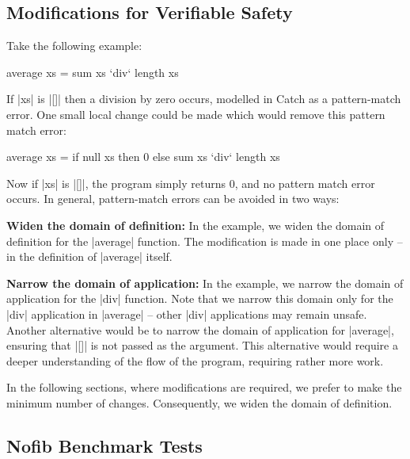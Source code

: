 \documentclass[preprint]{sigplanconf}
\newcommand{\para}[1]{\vspace{2mm}\noindent\textbf{#1}}
\begin{document}
\subsection{Modifications for Verifiable Safety}
\label{sec:safety}

Take the following example:

\begin{code}
average xs = sum xs `div` length xs
\end{code}

If |xs| is |[]| then a division by zero occurs, modelled in Catch as a pattern-match error. One small local change could be made which would remove this pattern match error:

\begin{code}
average xs = if null xs then 0 else sum xs `div` length xs
\end{code}

\noindent Now if |xs| is |[]|, the program simply returns 0, and no pattern match error occurs. In general, pattern-match errors can be avoided in two ways:

\para{Widen the domain of definition:} In the example, we widen the domain of definition for the |average| function. The modification is made in one place only -- in the definition of |average| itself.

\para{Narrow the domain of application:} In the example, we narrow the domain of application for the |div| function.  Note that we narrow this domain only for the |div| application in |average| -- other |div| applications may remain unsafe. Another alternative would be to narrow the domain of application for |average|, ensuring that |[]| is not passed as the argument. This alternative would require a deeper understanding of the flow of the program, requiring rather more work.

In the following sections, where modifications are required, we prefer to make the minimum number of changes. Consequently, we widen the domain of definition.

\subsection{Nofib Benchmark Tests}
\label{sec:imaginary}
\end{document}
